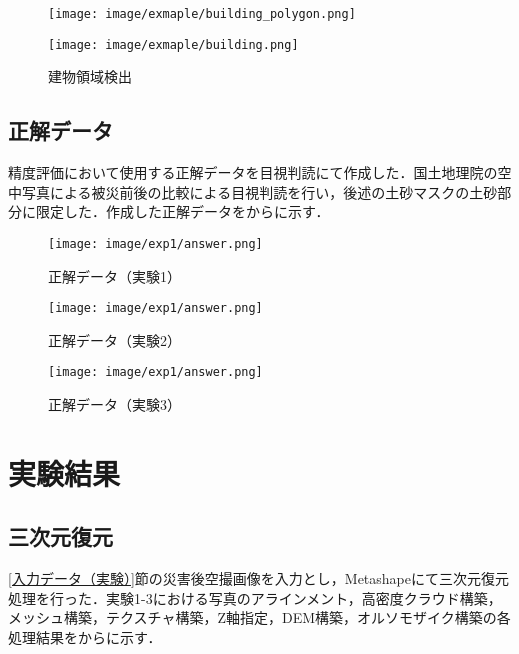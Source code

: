       \begin{figure}[t]
        \begin{minipage}[c]{0.45\hsize}
          \centering
          \texttt{[image: image/exmaple/building\_polygon.png]}
        \end{minipage}
        \begin{minipage}[c]{0.45\hsize}
          \centering
          \texttt{[image: image/exmaple/building.png]}
        \end{minipage}
        \caption{建物領域検出}
        \label{基盤地図情報（実験3）}
      \end{figure}


    \subsection*{正解データ}
      精度評価において使用する正解データを目視判読にて作成した．国土地理院の空中写真による被災前後の比較\cite{国土地理院空撮画像1, 国土地理院空撮画像2}による目視判読を行い，後述の土砂マスクの土砂部分に限定した．作成した正解データをからに示す．

      \begin{figure}[t]
        \centering
        \texttt{[image: image/exp1/answer.png]}
        \caption{正解データ（実験1）}
        \label{正解データ（実験1）}
      \end{figure}

      \begin{figure}[t]
        \centering
        \texttt{[image: image/exp1/answer.png]}
        \caption{正解データ（実験2）}
      \end{figure}

      \begin{figure}[t]
        \centering
        \texttt{[image: image/exp1/answer.png]}
        \caption{正解データ（実験3）}
        \label{正解データ（実験3）}
      \end{figure}


  \section{実験結果}
    \label{実験結果}
    \subsection*{三次元復元}
      \label{三次元復元}
      \ref{入力データ（実験）}節の災害後空撮画像を入力とし，Metashapeにて三次元復元処理を行った．実験1-3における写真のアラインメント，高密度クラウド構築，メッシュ構築，テクスチャ構築，Z軸指定，DEM構築，オルソモザイク構築の各処理結果をからに示す．

